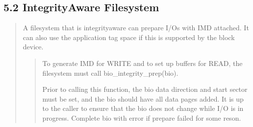 \documentclass[a4paper,11pt,english]{sphinxmanual}
\begin{document}
\subsection{5.2 Integrity\sphinxhyphen{}Aware Filesystem}
\label{\detokenize{data-integrity:integrity-aware-filesystem}}\begin{quote}

A filesystem that is integrity\sphinxhyphen{}aware can prepare I/Os with IMD
attached.  It can also use the application tag space if this is
supported by the block device.

\begin{quote}

To generate IMD for WRITE and to set up buffers for READ, the
filesystem must call bio\_integrity\_prep(bio).

Prior to calling this function, the bio data direction and start
sector must be set, and the bio should have all data pages
added.  It is up to the caller to ensure that the bio does not
change while I/O is in progress.
Complete bio with error if prepare failed for some reson.
\end{quote}
\end{quote}
\end{document}
